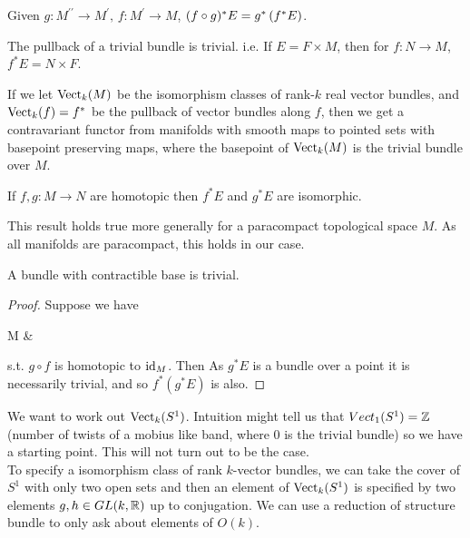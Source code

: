 \documentclass{article}
\begin{document}
\begin{lemma}
	Given $g:M^{\prime\prime}\to M^{\prime}, \, f:M^\prime \to M$, $(f \circ g)^{\ast}E = g^{\ast}\left( f^{\ast}E \right)$.
\end{lemma}

\begin{lemma}
	The pullback of a trivial bundle is trivial. i.e. If $E =F \times M$, then for $f:N \to M$, $f^{\ast}E = N \times F$.
\end{lemma}

\begin{remark}
	If we let $\operatorname{Vect}_k(M)$ be the isomorphism classes of rank-$k$ real vector bundles, and $\operatorname{Vect}_k(f) = f^{\ast}$ be the pullback of vector bundles along $f$, then we get a contravariant functor from manifolds with smooth maps to pointed sets with basepoint preserving maps, where the basepoint of $\operatorname{Vect}_k(M)$ is the trivial bundle over $M$.
\end{remark}

\begin{prop}
	If $f,g : M \to N$ are homotopic then $f^{\ast}E$ and $g^{\ast}E$ are isomorphic.
\end{prop}
\begin{remark}
	This result holds true more generally for a  paracompact topological space $M$. As all manifolds are paracompact, this holds in our case.
\end{remark}
\begin{corollary}
	A bundle with contractible base is trivial.
\end{corollary}
\begin{proof}
	Suppose we have 
	\begin{tkz}
		M  & \ast {}
	\end{tkz}
	s.t. $g \circ f$ is homotopic to $\operatorname{id}_M$. Then 
	As $g^{\ast}E$ is a bundle over a point it is necessarily trivial, and so $f^{\ast}(g^{\ast}E)$ is also.
\end{proof}

\begin{example}
	We want to work out $\operatorname{Vect}_k(S^1)$. Intuition might tell us that $Vect_1(S^1) = \mathbb{Z}$ (number of twists of a mobius like band, where 0 is the trivial bundle) so we have a starting point. This will not turn out to be the case. \\
	To specify a isomorphism class of rank $k$-vector bundles, we can take the cover of $S^1$ with only two open sets and then an element of $\operatorname{Vect}_k(S^1)$ is specified by two elements $g,h \in GL(k,\mathbb{R})$ up to conjugation. We can use a reduction of structure bundle to only ask about elements of $O(k)$. 
\end{example}
\end{document}
